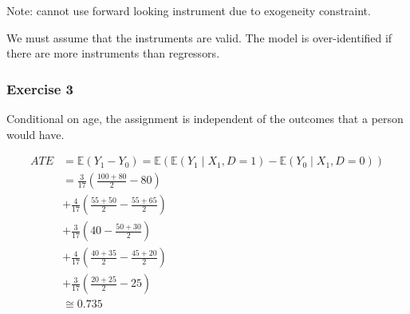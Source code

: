 {{\begin{enumerate}[label=(\arabic*)]
{Note: cannot use forward looking instrument due to exogeneity constraint.

We must assume that the instruments are valid. The model is over-identified if there are more instruments than regressors.
}
\end{enumerate}
}
{
\subsubsection*{Exercise 3}

\begin{enumerate}[label=(\arabic*)]
{\item 
Conditional on age, the assignment is independent of the outcomes that a person would have.
}
{\item 
$$
\begin{aligned}
A T E & =\mathbb{E}\left(Y_{1}-Y_{0}\right)=\mathbb{E}\left(\mathbb{E}\left(Y_{1} \mid X_{1}, D=1\right)-\mathbb{E}\left(Y_{0} \mid X_{1}, D=0\right)\right) \\
& =\frac{3}{17}\left(\frac{100+80}{2}-80\right) \\
& +\frac{4}{17}\left(\frac{55+50}{2}-\frac{55+65}{2}\right) \\
& +\frac{3}{17}\left(40-\frac{50+30}{2}\right) \\
& +\frac{4}{17}\left(\frac{40+35}{2}-\frac{45+20}{2}\right) \\
& +\frac{3}{17}\left(\frac{20+25}{2}-25\right) \\
& \cong 0.735
\end{aligned}
$$
}
\end{enumerate}
}
}
